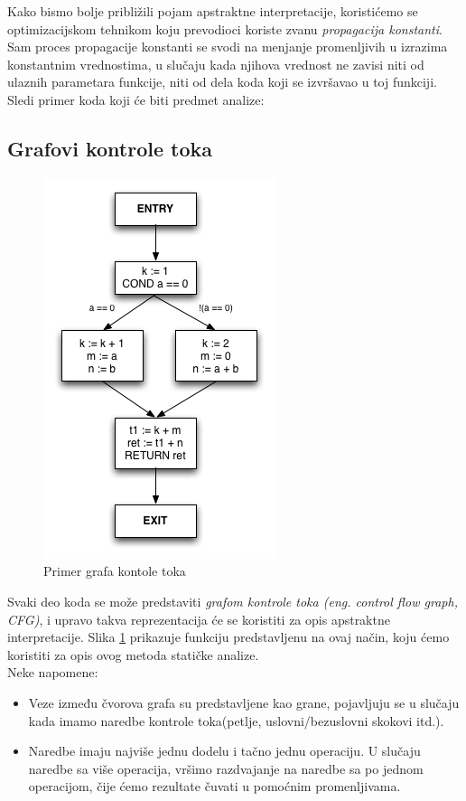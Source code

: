 Kako bismo bolje približili pojam apstraktne interpretacije, koristićemo se
optimizacijskom tehnikom koju prevodioci koriste zvanu \emph{propagacija konstanti}.
Sam proces propagacije konstanti se svodi na menjanje promenljivih u izrazima
konstantnim vrednostima, u slučaju kada njihova vrednost ne zavisi niti od
ulaznih parametara funkcije, niti od dela koda koji se izvršavao u toj funkciji.
Sledi primer koda koji će biti predmet analize:


\subsection{Grafovi kontrole toka}
\label{subsec:cfgs}

\begin{figure}
\begin{center}
\includegraphics[scale=0.5]{Treehydra-cfg.png}
\end{center}
\caption{Primer grafa kontole toka}
\label{fig:graf}
\end{figure}

Svaki deo koda se može predstaviti \emph{grafom kontrole toka (eng. control flow graph, CFG)},
i upravo takva reprezentacija će se koristiti za opis apstraktne interpretacije.
Slika \ref{fig:graf} prikazuje funkciju predstavljenu na ovaj način, koju ćemo koristiti za
opis ovog metoda statičke analize.\\
Neke napomene:
\begin{itemize}
\item Veze između čvorova grafa su predstavljene kao grane, pojavljuju se u slučaju
kada imamo naredbe kontrole toka(petlje, uslovni/bezuslovni skokovi itd.).
\item Naredbe imaju najviše jednu dodelu i tačno jednu operaciju. U slučaju naredbe
sa više operacija, vršimo razdvajanje na naredbe sa po jednom operacijom, čije
ćemo rezultate čuvati u pomoćnim promenljivama.
\end{itemize}

